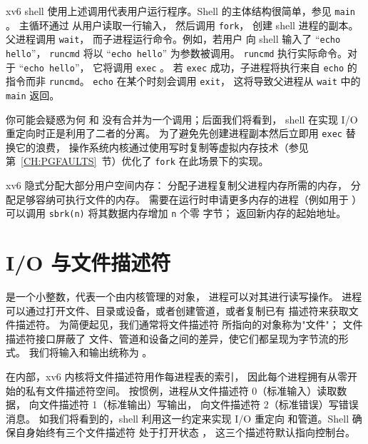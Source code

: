 xv6 shell 使用上述调用代表用户运行程序。Shell 的主体结构很简单，参见
\lstinline{main}
。
主循环通过
 从用户读取一行输入，
然后调用
\lstinline{fork}，
创建 shell 进程的副本。父进程调用
\lstinline{wait}，
而子进程运行命令。例如，若用户
向 shell 输入了
``\lstinline{echo hello}''，
\lstinline{runcmd}
将以
``\lstinline{echo hello}''
为参数被调用。
\lstinline{runcmd}
执行实际命令。对于
``\lstinline{echo hello}''，
它将调用
\lstinline{exec}
。
若
\lstinline{exec}
成功，子进程将执行来自
\lstinline{echo}
的指令而非
\lstinline{runcmd}。
\lstinline{echo}
在某个时刻会调用
\lstinline{exit}，
这将导致父进程从
\lstinline{wait}
中的
\lstinline{main}
 返回。

你可能会疑惑为何
和
没有合并为一个调用；后面我们将看到，
shell 在实现 I/O 重定向时正是利用了二者的分离。
为了避免先创建进程副本然后立即用 \lstinline{exec} 替换它的浪费，
操作系统内核通过使用写时复制等虚拟内存技术（参见第~\ref{CH:PGFAULTS}~节）优化了
\lstinline{fork}
在此场景下的实现。

xv6 隐式分配大部分用户空间内存：
分配子进程复制父进程内存所需的内存，
分配足够容纳可执行文件的内存。
需要在运行时申请更多内存的进程（例如用于
）
可以调用
\lstinline{sbrk(n)}
将其数据内存增加
\lstinline{n} 个零
字节；
返回新内存的起始地址。

\section{I/O 与文件描述符}

是一个小整数，代表一个由内核管理的对象，
进程可以对其进行读写操作。
进程可以通过打开文件、目录或设备，或者创建管道，或者复制已有
描述符来获取文件描述符。
为简便起见，我们通常将文件描述符
所指向的对象称为"文件"；
文件描述符接口屏蔽了
文件、管道和设备之间的差异，使它们都呈现为字节流的形式。
我们将输入和输出统称为 。

在内部，xv6 内核将文件描述符用作每进程表的索引，
因此每个进程拥有从零开始的私有文件描述符空间。
按惯例，进程从文件描述符 0（标准输入）读取数据，
向文件描述符 1（标准输出）写输出，
向文件描述符 2（标准错误）写错误消息。
如我们将看到的，shell 利用这一约定来实现 I/O 重定向
和管道。Shell 确保自身始终有三个文件描述符
处于打开状态
，
这三个描述符默认指向控制台。

